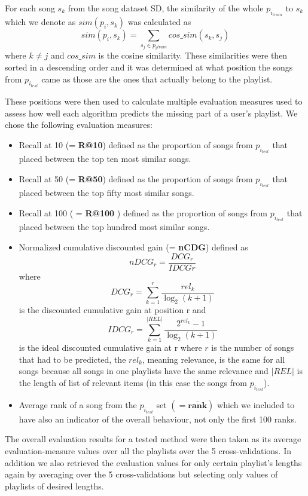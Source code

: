 For each song $ s_k $ from the song dataset SD, the similarity of the whole $p_{i_{train}}$ to $s_k$ which we denote as $ sim(p_i, s_k) $ was calculated as $$ sim(p_i, s_k) =\sum_{s_j\in{p_i{_{train}}}} cos\_sim(s_k, s_j) $$ where $ k \neq j$ and $cos\_sim$ is the cosine similarity. These similarities were then sorted in a descending order and it was determined at what position the songs from $p_{i_{test}} $ came as those are the ones that actually belong to the playlist. 

These positions were then used to calculate multiple evaluation measures used to assess how well each algorithm predicts the missing part of a user's playlist. We chose the following evaluation measures:
\begin{itemize}
    \item Recall at 10 (= \textbf{R@10}) defined as the proportion of songs from $p_{i_{test}} $ that placed between the top ten most similar songs.
    \item Recall at 50 (= \textbf{R@50}) defined as the proportion of songs from $p_{i_{test}} $ that placed between the top fifty most similar songs.
    \item Recall at 100 ( = \textbf{R@100} ) defined as the proportion of songs from $p_{i_{test}} $ that placed between the top hundred most similar songs.
    \item Normalized cumulative discounted gain (= \textbf{nCDG}) defined as 
    $${nDCG_{r}} = \frac{DCG_{r}}{IDCG{r}} $$
    where 
    $${DCG_{r}} =\sum_{k=1}^{r}{\frac {rel_{k}}{\log _{2}(k+1)}} $$ 
    is the discounted cumulative gain at position r and 
    $$ {IDCG_{r}} =\sum _{k=1}^{|REL|}{\frac {2^{rel_{k}}-1}{\log _{2}(k+1)}} $$
    is the ideal discounted cumulative gain at r
    where $r$ is the number of songs that had to be predicted, the $rel_k$, meaning relevance, is the same for all songs because all songs in one playlists have the same relevance and $|REL|$ is the length of list of relevant items (in this case the songs from $p_{i_{test}}$).
    \item Average rank of a song from the $p_{i_{test}}$ set $ \boldsymbol{ (= \overline{rank})} $ which we included to have also an indicator of the overall behaviour, not only the first 100 ranks.

\end{itemize}

The overall evaluation results for a tested method were then taken as its 
average evaluation-measure values over all the playlists over the 5 
cross-validations. In addition we also retrieved the evaluation values for only certain playlist's lengths again by averaging over the 5 cross-validations but selecting only values of playlists of desired lengths.

